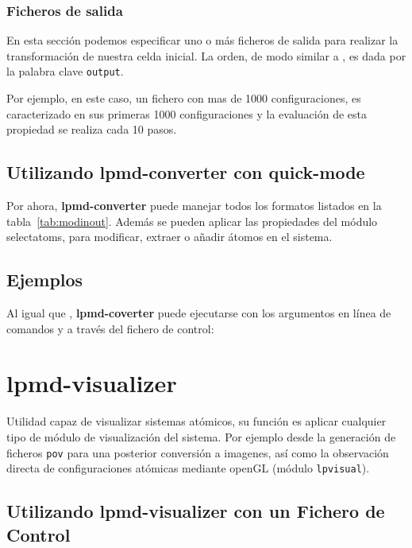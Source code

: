 \subsubsection{Ficheros de salida}
En esta secci\'on podemos especificar uno o m\'as ficheros de salida para realizar la transformaci\'on de nuestra celda inicial. La orden, de modo similar a {\lpmd}, es dada por la palabra clave \verb|output|.


Por ejemplo, en este caso, un fichero con mas de 1000 configuraciones, es caracterizado en sus primeras 1000 configuraciones y la evaluaci\'on de esta propiedad se realiza cada 10 pasos.

\subsection{Utilizando lpmd-converter con quick-mode}
Por ahora, \textbf{lpmd-converter} puede manejar todos los formatos listados en la tabla~\ref{tab:modinout}. Adem\'as se pueden aplicar las propiedades del m\'odulo selectatoms, para modificar, extraer o a\~nadir \'atomos en el sistema.

\subsection{Ejemplos}
Al igual que {\lpmd}, \textbf{lpmd-coverter} puede ejecutarse con los argumentos en l\'inea de comandos y a trav\'es del fichero de control:


\section{lpmd-visualizer}
Utilidad capaz de visualizar sistemas at\'omicos, su funci\'on es aplicar cualquier tipo de m\'odulo de visualizaci\'on del sistema. Por ejemplo desde la generaci\'on de ficheros \verb|pov| para una posterior conversi\'on a imagenes, as\'i como la observaci\'on directa de configuraciones at\'omicas mediante openGL (m\'odulo \verb|lpvisual|).

\subsection{Utilizando lpmd-visualizer con un Fichero de Control}

